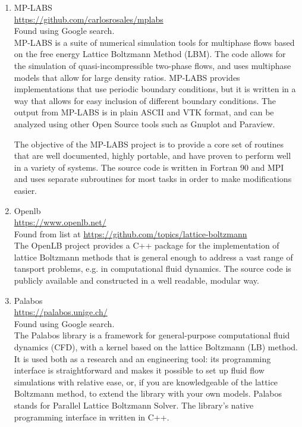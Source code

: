 \documentclass{article}
\begin{document}
\begin{enumerate}
	\item MP-LABS
\\
	\href{https://github.com/carlosrosales/mplabs}{https://github.com/carlosrosales/mplabs}
\\
	Found using Google search.\\
	MP-LABS is a suite of numerical simulation tools for multiphase flows based on the free energy Lattice Boltzmann Method (LBM). The code allows for the simulation of quasi-incompressible two-phase flows, and uses multiphase models that allow for large density ratios. MP-LABS provides implementations that use periodic boundary conditions, but it is written in a way that allows for easy inclusion of different boundary conditions. The output from MP-LABS is in plain ASCII and VTK format, and can be analyzed using other Open Source tools such as Gnuplot and Paraview.
	
	The objective of the MP-LABS project is to provide a core set of routines that are well documented, highly portable, and have proven to perform well in a variety of systems. The source code is written in Fortran 90 and MPI and uses separate subroutines for most tasks in order to make modifications easier.
	
	\item Openlb \\  
	\href{https://www.openlb.net/}{https://www.openlb.net/}
\\
		Found from list at \href{https://github.com/topics/lattice-boltzmann}{https://github.com/topics/lattice-boltzmann}\\
	The OpenLB project provides a C++ package for the implementation of lattice Boltzmann methods that is general enough to address a vast range of tansport problems, e.g. in computational fluid dynamics. The source code is publicly available and constructed in a well readable, modular way. 
	
	\item Palabos \\
	\href{https://palabos.unige.ch/}{https://palabos.unige.ch/}
\\
	Found using Google search.\\
	The Palabos library is a framework for general-purpose computational fluid dynamics (CFD), with a kernel based on the lattice Boltzmann (LB) method. It is used both as a research and an engineering tool: its programming interface is straightforward and makes it possible to set up fluid flow simulations with relative ease, or, if you are knowledgeable of the lattice Boltzmann method, to extend the library with your own models. Palabos stands for Parallel Lattice Boltzmann Solver.
	The library’s native programming interface in written in C++. 
	

\end{enumerate}
\end{document}
